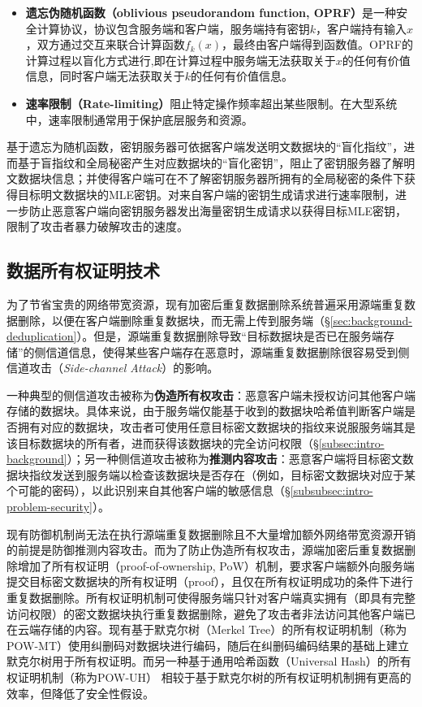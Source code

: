 \begin{itemize}[leftmargin=*]
    \item \textbf{遗忘伪随机函数（oblivious pseudorandom function, OPRF）}\cite{naor2004Number}是一种安全计算协议，协议包含服务端和客户端，服务端持有密钥$k$，客户端持有输入$x$，双方通过交互来联合计算函数$f_k(x)$，最终由客户端得到函数值。OPRF的计算过程以盲化方式进行,即在计算过程中服务端无法获取关于$x$的任何有价值信息，同时客户端无法获取关于$k$的任何有价值信息。
    \item \textbf{速率限制（Rate-limiting）}\cite{bellare2013DupLESS}阻止特定操作频率超出某些限制。在大型系统中，速率限制通常用于保护底层服务和资源。
\end{itemize}

基于遗忘为随机函数，密钥服务器可依据客户端发送明文数据块的“盲化指纹”，进而基于盲指纹和全局秘密产生对应数据块的“盲化密钥”，阻止了密钥服务器了解明文数据块信息；并使得客户端可在不了解密钥服务器所拥有的全局秘密的条件下获得目标明文数据块的MLE密钥。对来自客户端的密钥生成请求进行速率限制，进一步防止恶意客户端向密钥服务器发出海量密钥生成请求以获得目标MLE密钥，限制了攻击者暴力破解攻击的速度。

\subsection{数据所有权证明技术}
\label{subsec:background-encrypted-deduplication-pow}

为了节省宝贵的网络带宽资源，现有加密后重复数据删除系统普遍采用源端重复数据删除，以便在客户端删除重复数据块，而无需上传到服务端（\S\ref{sec:background-deduplication}）。但是，源端重复数据删除导致“目标数据块是否已在服务端存储”的侧信道信息，使得某些客户端存在恶意时，源端重复数据删除很容易受到侧信道攻击（\textit{Side-channel Attack}）\cite{harnik2010side,halevi11}的影响。

一种典型的侧信道攻击被称为\textbf{伪造所有权攻击}：恶意客户端未授权访问其他客户端存储的数据块\cite{harnik2010side,mulazzani11}。具体来说，由于服务端仅能基于收到的数据块哈希值判断客户端是否拥有对应的数据块，攻击者可使用任意目标密文数据块的指纹来说服服务端其是该目标数据块的所有者，进而获得该数据块的完全访问权限（\S\ref{subsec:intro-background}）；另一种侧信道攻击被称为\textbf{推测内容攻击}：恶意客户端将目标密文数据块指纹发送到服务端以检查该数据块是否存在（例如，目标密文数据块对应于某个可能的密码\cite{harnik2010side}），以此识别来自其他客户端的敏感信息（\S\ref{subsubsec:intro-problem-security}）。

现有防御机制尚无法在执行源端重复数据删除且不大量增加额外网络带宽资源开销的前提是防御推测内容攻击。而为了防止伪造所有权攻击，源端加密后重复数据删除增加了所有权证明（proof-of-ownership, PoW）机制\cite{halevi11}，要求客户端额外向服务端提交目标密文数据块的所有权证明（proof），且仅在所有权证明成功的条件下进行重复数据删除。所有权证明机制可使得服务端只针对客户端真实拥有（即具有完整访问权限）的密文数据块执行重复数据删除，避免了攻击者非法访问其他客户端已在云端存储的内容。现有基于默克尔树（Merkel Tree）的所有权证明机制（称为POW-MT）\cite{xu2013weak}使用纠删码对数据块进行编码，随后在纠删码编码结果的基础上建立默克尔树用于所有权证明。而另一种基于通用哈希函数（Universal Hash）的所有权证明机制（称为POW-UH）\cite{halevi2011proofs} 相较于基于默克尔树的所有权证明机制拥有更高的效率，但降低了安全性假设。

